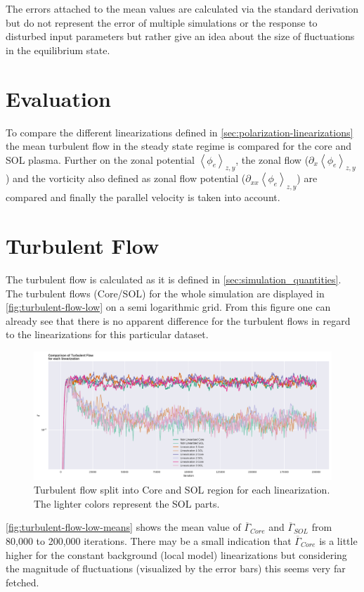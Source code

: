 \documentclass[master.tex]{subfiles}
\newcommand{\meanxy}[1]{\left<#1\right>_{z,y}}
\newcommand{\Tflow}[0]{\overline{\Gamma}}
\begin{document}
\begin{blockquote}
    The errors attached to the mean values are calculated via the standard derivation but do not represent the error of multiple simulations or the response to disturbed input parameters but rather give an idea about the size of fluctuations in the equilibrium state.
\end{blockquote}
    
\section{Evaluation}
To compare the different linearizations defined in \autoref{sec:polarization-linearizations} the mean turbulent flow in the steady state regime is compared for the core and \ac{SOL} plasma. Further on the zonal potential  $\meanxy{\phi_e}$, the zonal flow ($\partial_x \meanxy{\phi_e}$) and the vorticity also defined as zonal flow potential ($\partial_{xx}\meanxy{\phi_e}$) are compared and finally the parallel velocity is taken into account.




\section{Turbulent Flow}
The turbulent flow is calculated as it is defined in \autoref{sec:simulation_quantities}. The turbulent flows (Core/\ac{SOL}) for the whole simulation are displayed in \autoref{fig:turbulent-flow-low} on a semi logarithmic grid. From this figure one can already see that there is no apparent difference for the turbulent flows in regard to the linearizations for this particular dataset.
\begin{figure}[!htbp]
    \includegraphics[width=\linewidth]{pdfs/turbulent-flow-low.pdf}
    \caption{Turbulent flow split into Core and \ac{SOL} region for each linearization. The lighter colors represent the \ac{SOL} parts.}
    \label{fig:turbulent-flow-low}
\end{figure}
\autoref{fig:turbulent-flow-low-means} shows the mean value of $\Tflow_{Core}$ and $\Tflow_{SOL}$ from 80,000 to 200,000 iterations. There may be a small indication that $\Tflow_{Core}$ is a little higher for the constant background (local model) linearizations but considering the magnitude of fluctuations (visualized by the error bars) this seems very far fetched. 
\end{document}

